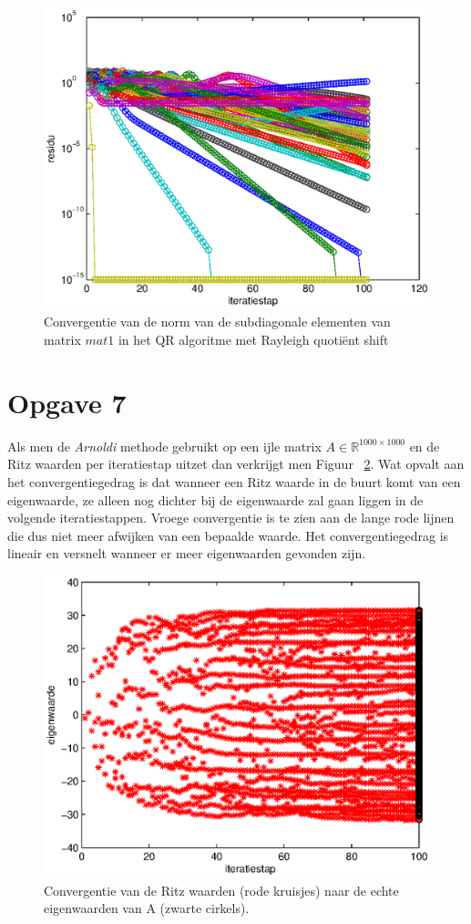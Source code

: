 \documentclass[a4paper]{article}
\newcommand{\opgave}[1]{\section*{Opgave #1}}
\begin{document}
\begin{figure}
\centerline{\includegraphics{pictures/opgave6.eps}}
\caption{Convergentie van de norm van de subdiagonale elementen van matrix $mat1$ in het QR algoritme met Rayleigh quoti\"{e}nt shift}
\label{fig:opgave6}
\end{figure}
\opgave{7}
Als men de \textit{Arnoldi} methode gebruikt op een ijle matrix $A \in \mathbb{R}^{1000\times1000}$ en de Ritz waarden per iteratiestap uitzet dan verkrijgt men Figuur ~\ref{fig:opgave7}.
Wat opvalt aan het convergentiegedrag is dat wanneer een Ritz waarde in de buurt komt van een eigenwaarde, ze alleen nog dichter bij de eigenwaarde zal gaan liggen in de volgende iteratiestappen. Vroege convergentie is te zien aan de lange rode lijnen die dus niet meer afwijken van een bepaalde waarde. Het convergentiegedrag is lineair en versnelt wanneer er meer eigenwaarden gevonden zijn.
\begin{figure}
\centerline{\includegraphics{pictures/opgave7.eps}}
\caption{Convergentie van de Ritz waarden (rode kruisjes) naar de echte eigenwaarden van A (zwarte cirkels).}
\label{fig:opgave7}
\end{figure}
\end{document}
